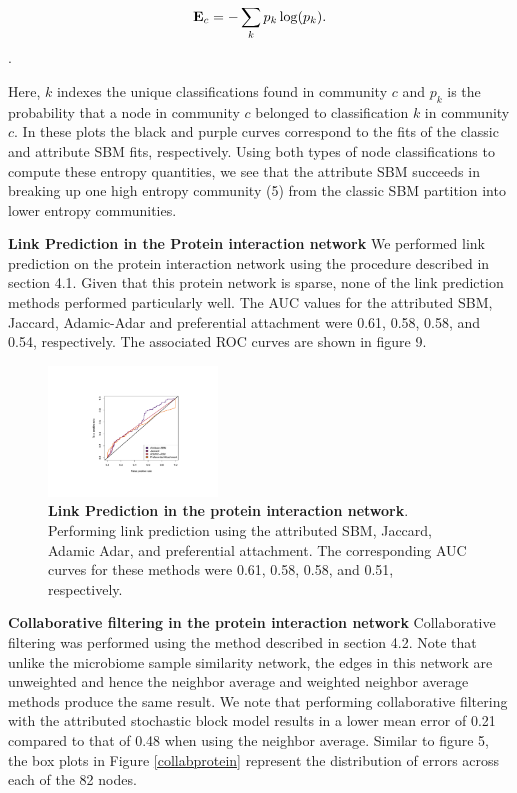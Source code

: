 \documentclass[journal]{IEEEtran}
\begin{document}
\begin{equation}
{\bf E}_{c}=-\sum_{k} p_{k}\log(p_{k}).
\end{equation}.

Here, $k$ indexes the unique classifications found in community $c$ and $p_{k}$ is the probability that a node in community $c$ belonged to classification $k$ in community $c$. In these plots the black and purple curves correspond to the fits of the classic and attribute SBM fits, respectively. Using both types of node classifications to compute these entropy quantities, we see that the attribute SBM succeeds in breaking up one high entropy community (5) from the classic SBM partition into lower entropy communities. 

{\bf Link Prediction in the Protein interaction network}
We performed link prediction on the protein interaction network using the procedure described in section 4.1. Given that this protein network is sparse, none of the link prediction methods performed particularly well. The AUC values for the attributed SBM, Jaccard, Adamic-Adar and preferential attachment were 0.61, 0.58, 0.58, and 0.54, respectively. The associated ROC curves are shown in figure 9.  

\begin{figure}[h!]
\begin{center}
\includegraphics[width=0.4\textwidth]{ROC_Protein.pdf}
\caption{{\bf Link Prediction in the protein interaction network}. Performing link prediction using the attributed SBM, Jaccard, Adamic Adar, and preferential attachment. The corresponding AUC curves for these methods were 0.61, 0.58, 0.58, and 0.51, respectively.}
\end{center}
\end{figure}
{\bf Collaborative filtering in the protein interaction network}
Collaborative filtering was performed using the method described in section 4.2. Note that unlike the microbiome sample similarity network, the edges in this network are unweighted and hence the neighbor average and weighted neighbor average methods produce the same result. We note that performing collaborative filtering with the attributed stochastic block model results in a lower mean error of 0.21 compared to that of 0.48 when using the neighbor average. Similar to figure 5, the box plots in Figure \ref{collabprotein} represent the distribution of errors across each of the 82 nodes.
\end{document}

